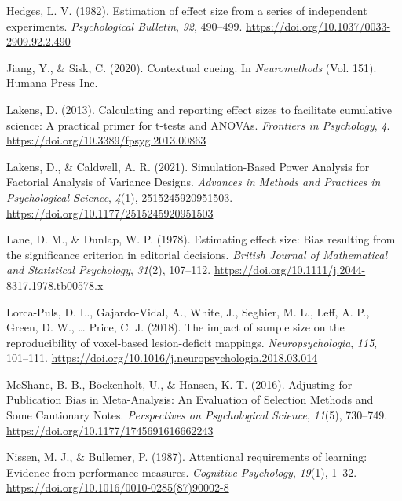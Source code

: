 \documentclass[
  man]{apa6}
\newlength{\cslhangindent}
\newlength{\cslentryspacingunit} %
\newenvironment{CSLReferences}[2] %
 {%
  \setlength{\parindent}{0pt}
  \ifodd #1
  \let\oldpar\par
  \def\par{\hangindent=\cslhangindent\oldpar}
  \fi
  \setlength{\parskip}{#2\cslentryspacingunit}
 }%
 {}
\begin{document}
\begin{CSLReferences}{1}{0}
\leavevmode{}%
Hedges, L. V. (1982). Estimation of effect size from a series of independent experiments. \emph{Psychological Bulletin}, \emph{92}, 490--499. \url{https://doi.org/10.1037/0033-2909.92.2.490}

\leavevmode{}%
Jiang, Y., \& Sisk, C. (2020). Contextual cueing. In \emph{Neuromethods} (Vol. 151). {Humana Press Inc}.

\leavevmode{}%
Lakens, D. (2013). Calculating and reporting effect sizes to facilitate cumulative science: A practical primer for t-tests and {ANOVAs}. \emph{Frontiers in Psychology}, \emph{4}. \url{https://doi.org/10.3389/fpsyg.2013.00863}

\leavevmode{}%
Lakens, D., \& Caldwell, A. R. (2021). Simulation-{Based Power Analysis} for {Factorial Analysis} of {Variance Designs}. \emph{Advances in Methods and Practices in Psychological Science}, \emph{4}(1), 2515245920951503. \url{https://doi.org/10.1177/2515245920951503}

\leavevmode{}%
Lane, D. M., \& Dunlap, W. P. (1978). Estimating effect size: {Bias} resulting from the significance criterion in editorial decisions. \emph{British Journal of Mathematical and Statistical Psychology}, \emph{31}(2), 107--112. \url{https://doi.org/10.1111/j.2044-8317.1978.tb00578.x}

\leavevmode{}%
Lorca-Puls, D. L., Gajardo-Vidal, A., White, J., Seghier, M. L., Leff, A. P., Green, D. W., \ldots{} Price, C. J. (2018). The impact of sample size on the reproducibility of voxel-based lesion-deficit mappings. \emph{Neuropsychologia}, \emph{115}, 101--111. \url{https://doi.org/10.1016/j.neuropsychologia.2018.03.014}

\leavevmode{}%
McShane, B. B., Böckenholt, U., \& Hansen, K. T. (2016). Adjusting for {Publication Bias} in {Meta-Analysis}: {An Evaluation} of {Selection Methods} and {Some Cautionary Notes}. \emph{Perspectives on Psychological Science}, \emph{11}(5), 730--749. \url{https://doi.org/10.1177/1745691616662243}

\leavevmode{}%
Nissen, M. J., \& Bullemer, P. (1987). Attentional requirements of learning: {Evidence} from performance measures. \emph{Cognitive Psychology}, \emph{19}(1), 1--32. \url{https://doi.org/10.1016/0010-0285(87)90002-8}


\end{CSLReferences}
\end{document}
